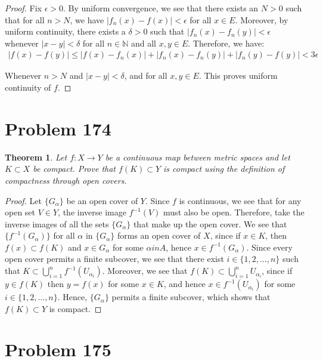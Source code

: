 \documentclass[psamsfonts]{amsart}
\newtheorem{thm}{Theorem}[section]
\theoremstyle{definition}
\theoremstyle{remark}
\numberwithin{equation}{section}
\begin{document}
\begin{proof}
Fix $\epsilon > 0$. By uniform convergence, we see that there exists an $N > 0$ such that for all $n > N$, we have $|f_n(x) - f(x)| < \epsilon$ for all $x \in E$. Moreover, by uniform continuity, there exists a $\delta > 0$ such that $|f_n(x) - f_n(y) | < \epsilon$ whenever $|x-y| < \delta$ for all $n \in \mathbb{N}$ and all $x,y \in E$. Therefore, we have:
\begin{eqnarray}
|f(x) - f(y)| \leq |f(x) - f_n(x)| + |f_n(x) - f_n(y)| + |f_n(y) - f(y)| < 3\epsilon
\end{eqnarray}

Whenever $n > N$ and $|x - y| < \delta$, and for all $x,y \in E$. This proves uniform continuity of $f$. 
\end{proof}

\section{Problem 174}

\begin{thm}
Let $f: X \to Y$ be a continuous map between metric spaces and let $K \subset X$ be compact. Prove that $f(K) \subset Y$ is compact using the definition of compactness through open covers.
\end{thm}

\begin{proof}
Let $\{ G_{\alpha} \}$ be an open cover of $Y$. Since $f$ is continuous, we see that for any open set $V \in Y$, the inverse image $f^{-1}(V)$ must also be open. Therefore, take the inverse images of all the sets $\{ G_{\alpha} \}$ that make up the open cover. We see that $\{ f^{-1} (G_{\alpha}) \}$ for all $\alpha$ in $\{ G_{\alpha} \}$ forms an open cover of $X$, since if $x \in K$, then $f(x) \subset f(K)$ and $x \in G_{\alpha}$ for some $\alpha in A$, hence $x \in f^{-1}(G_{\alpha})$. Since every open cover permits a finite subcover, we see that there exist $i \in \{1,2, \ldots,n \}$ such that $K \subset \bigcup_{i=1}^n f^{-1} ( U_{\alpha_i})$. Moreover, we see that $f(K) \subset \bigcup_{i=1}^n U_{\alpha_i}$, since if $y \in f(K)$ then $y = f(x)$ for some $x \in K$, and hence $x \in f^{-1}(U_{\alpha_i})$ for some $i \in \{ 1,2, \ldots ,n \}$. Hence, $\{ G_{\alpha} \}$ permits a finite subcover, which shows that $f(K) \subset Y$ is compact.
\end{proof}

\section{Problem 175}
\end{document}
